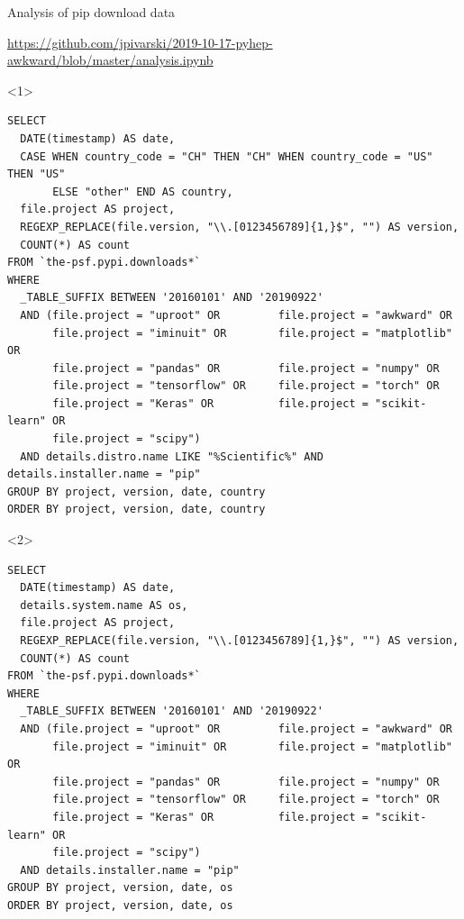 \documentclass[aspectratio=169]{beamer}
\begin{document}
\begin{frame}[fragile]{Analysis of pip download data }
\vspace{0.5 cm}
\scriptsize

\textcolor{blue}{\url{https://github.com/jpivarski/2019-10-17-pyhep-awkward/blob/master/analysis.ipynb}}

\vspace{0.25 cm}
\begin{onlyenv}<1>
\begin{verbatim}
SELECT
  DATE(timestamp) AS date,
  CASE WHEN country_code = "CH" THEN "CH" WHEN country_code = "US" THEN "US"
       ELSE "other" END AS country,
  file.project AS project,
  REGEXP_REPLACE(file.version, "\\.[0123456789]{1,}$", "") AS version,
  COUNT(*) AS count
FROM `the-psf.pypi.downloads*`
WHERE
  _TABLE_SUFFIX BETWEEN '20160101' AND '20190922'
  AND (file.project = "uproot" OR         file.project = "awkward" OR
       file.project = "iminuit" OR        file.project = "matplotlib" OR
       file.project = "pandas" OR         file.project = "numpy" OR
       file.project = "tensorflow" OR     file.project = "torch" OR
       file.project = "Keras" OR          file.project = "scikit-learn" OR
       file.project = "scipy")
  AND details.distro.name LIKE "%Scientific%" AND details.installer.name = "pip"
GROUP BY project, version, date, country
ORDER BY project, version, date, country
\end{verbatim}
\vspace{10 cm}
\end{onlyenv}\begin{onlyenv}<2>
\begin{verbatim}
SELECT
  DATE(timestamp) AS date,
  details.system.name AS os,
  file.project AS project,
  REGEXP_REPLACE(file.version, "\\.[0123456789]{1,}$", "") AS version,
  COUNT(*) AS count
FROM `the-psf.pypi.downloads*`
WHERE
  _TABLE_SUFFIX BETWEEN '20160101' AND '20190922'
  AND (file.project = "uproot" OR         file.project = "awkward" OR
       file.project = "iminuit" OR        file.project = "matplotlib" OR
       file.project = "pandas" OR         file.project = "numpy" OR
       file.project = "tensorflow" OR     file.project = "torch" OR
       file.project = "Keras" OR          file.project = "scikit-learn" OR
       file.project = "scipy")
  AND details.installer.name = "pip"
GROUP BY project, version, date, os
ORDER BY project, version, date, os
\end{verbatim}

\end{onlyenv}
\end{frame}
\end{document}
